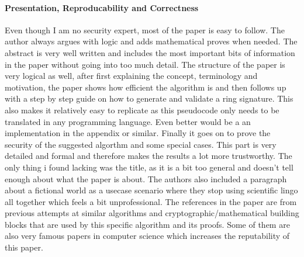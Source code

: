 \documentclass{scrartcl}
\begin{document}
\paragraph{Presentation, Reproducability and Correctness}{
Even though I am no security expert, most of the paper is easy to follow. The author always argues with logic and adds mathematical proves when needed. 
The abstract is very well written and includes the most important bits of information in the paper without going into too much detail. The structure of the paper is very logical as well, after first explaining the concept,  terminology and motivation, the paper shows how efficient the algorithm is and then follows up with a step by step guide on how to generate and validate a ring signature. This also makes it relatively easy to replicate as this pseudocode only needs to be translated in any programming language. Even better would be a an implementation in the appendix or similar. Finally it goes on to prove the security of the suggested algorthm and some special cases. This part is very detailed and formal and therefore makes the results a lot more trustworthy.
The only thing i found lacking was the title, as it is a bit too general and doesn't tell enough about what the paper is about. The authors also included a paragraph about a fictional world as a usecase scenario where they stop using scientific lingo all together which feels a bit  unprofessional.
The references in the paper are from previous attempts at similar algorithms and cryptographic/mathematical building blocks that are used by this specific algorithm and its proofs. Some of them are also very famous papers in computer science which increases the reputability of this paper.
}





\end{document}
